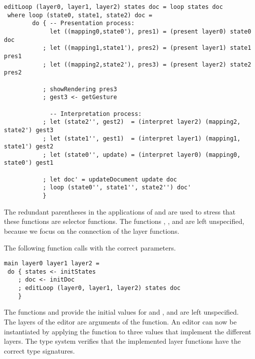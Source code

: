 \documentclass[preprint,natbib]{sigplanconf}
\begin{document}
\begin{small}
\begin{verbatim}
editLoop (layer0, layer1, layer2) states doc = loop states doc
 where loop (state0, state1, state2) doc = 
        do { -- Presentation process:
             let ((mapping0,state0'), pres1) = (present layer0) state0 doc
           ; let ((mapping1,state1'), pres2) = (present layer1) state1 pres1
           ; let ((mapping2,state2'), pres3) = (present layer2) state2 pres2

           ; showRendering pres3
           ; gest3 <- getGesture
 
             -- Interpretation process:
           ; let (state2'', gest2)  = (interpret layer2) (mapping2, state2') gest3
           ; let (state1'', gest1)  = (interpret layer1) (mapping1, state1') gest2
           ; let (state0'', update) = (interpret layer0) (mapping0, state0') gest1
       
           ; let doc' = updateDocument update doc
           ; loop (state0'', state1'', state2'') doc'
           }
\end{verbatim}
\end{small}


The redundant parentheses in the applications of  and  are used to stress that these functions are selector functions. The functions , , and  are left unspecified, because we focus on the connection of the layer functions. 

The following function  calls  with the correct parameters.

\begin{small}
\begin{verbatim}
main layer0 layer1 layer2 = 
 do { states <- initStates
    ; doc <- initDoc 
    ; editLoop (layer0, layer1, layer2) states doc
    }
\end{verbatim}
\end{small}

The functions  and  provide the initial values for  and , and are left unspecified. The layers of the editor are arguments of the  function. An editor can now be instantiated by applying the function  to three  values that implement the different layers. The type system verifies that the implemented layer functions have the correct type signatures.
\end{document}
